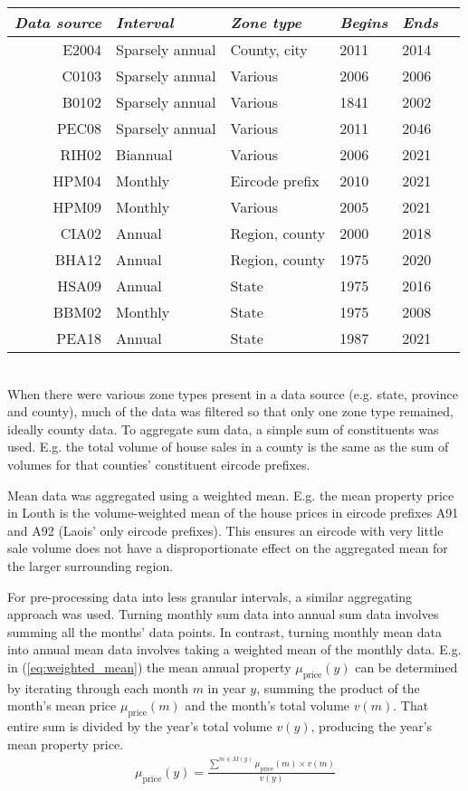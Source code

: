 \documentclass[twocolumn]{article}
\begin{document}
\begin{tabularx}{0.5\textwidth}{r X X X X X}
    \textit{Data source} & \textit{Interval} & \textit{Zone type} & \textit{Begins} & \textit{Ends} \\ \hline
    E2004 & Sparsely annual & County, city & 2011 & 2014 \\ \hline
    C0103 & Sparsely annual & Various & 2006 & 2006 \\ \hline
    B0102 & Sparsely annual & Various & 1841 & 2002 \\ \hline
    PEC08 & Sparsely annual & Various & 2011 & 2046 \\ \hline
    RIH02 & Biannual & Various & 2006 & 2021 \\ \hline
    HPM04 & Monthly & Eircode prefix & 2010 & 2021 \\ \hline
    HPM09 & Monthly & Various & 2005 & 2021 \\ \hline
    CIA02 & Annual & Region, county & 2000 & 2018 \\ \hline
    BHA12 & Annual & Region, county & 1975 & 2020 \\ \hline
    HSA09 & Annual & State & 1975 & 2016 \\ \hline
    BBM02 & Monthly & State & 1975 & 2008 \\ \hline
    PEA18 & Annual & State & 1987 & 2021
\end{tabularx} \\

When there were various zone types present in a data source (e.g. state, province
and county), much of the data was filtered so that only one zone type remained,
ideally county data.  To aggregate sum data, a simple sum of constituents was used.
E.g. the total volume of house sales in a county is the same as the sum of volumes
for that counties' constituent eircode prefixes.

Mean data was aggregated using a weighted mean.  E.g. the mean property price in
Louth is the volume-weighted mean of the house prices in eircode prefixes
A91 and A92 (Laois' only eircode prefixes).  This ensures an eircode with very little
sale volume does not have a disproportionate effect on the aggregated mean for the
larger surrounding region.

For pre-processing data into less granular intervals, a similar aggregating approach
was used.  Turning monthly sum data into annual sum data involves summing all the months'
data points.  In contrast, turning monthly mean data into annual mean data involves taking a weighted
mean of the monthly data.  E.g. in (\ref{eq:weighted_mean}) the mean annual property
$\mu_{\text{price}}(y)$ can be determined by iterating through each month $m$ in
year $y$, summing the product of the month's mean price $\mu_{\text{price}}(m)$ and the month's total volume
$v(m)$.  That entire sum is divided by the year's total volume $v(y)$, producing the
year's mean property price.
\begin{align}
    \mu_{\text{price}}(y) = \frac{\sum^{m \in M(y)}\mu_{\text{price}}(m) \times v(m)}
    {v(y)}\label{eq:weighted_mean}
\end{align}
\end{document}
